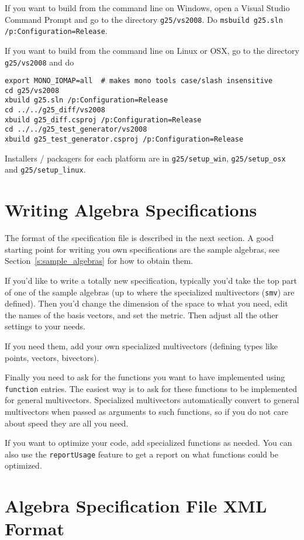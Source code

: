 \documentclass[10pt, a4paper]{article}
\begin{document}
If you want to build from the command line on Windows, open a Visual Studio Command Prompt and
go to the directory {\tt g25/vs2008}. Do {\tt msbuild g25.sln /p:Configuration=Release}.

If you want to build from the command line on Linux or OSX, go to the directory {\tt g25/vs2008}
and do 
\begin{verbatim}
export MONO_IOMAP=all  # makes mono tools case/slash insensitive
cd g25/vs2008
xbuild g25.sln /p:Configuration=Release
cd ../../g25_diff/vs2008
xbuild g25_diff.csproj /p:Configuration=Release
cd ../../g25_test_generator/vs2008
xbuild g25_test_generator.csproj /p:Configuration=Release
\end{verbatim}

Installers / packagers for each platform are in {\tt g25/setup\_win}, 
{\tt g25/setup\_osx} and {\tt g25/setup\_linux}.


\section{Writing Algebra Specifications}

The format of the specification file is described in the next section.
A good starting point for writing you own specifications are the sample algebras,
see Section~\ref{s:sample_algebras} for how to obtain them.

If you'd like to write a totally new specification, typically you'd take the top part
of one of the sample algebras (up to where the specialized multivectors ({\tt smv}) are defined).
Then you'd change the dimension of the space to what you need, edit the names of the basis
vectors, and set the metric. Then adjust all the other settings to your needs.

If you need them, add your own specialized multivectors (defining types like points,
vectors, bivectors). 

Finally you need to ask for the functions you want to have implemented using {\tt function} entries.
The easiest way is to ask for these functions to be implemented for general multivectors.
Specialized multivectors automatically convert to general multivectors when passed
as arguments to such functions, so if you do not care about speed they are all you need.

If you want to optimize your code, add specialized functions as needed. You can
also use the {\tt reportUsage} feature to get a report on what functions could be
optimized.

\section{Algebra Specification File XML Format}
\end{document}
